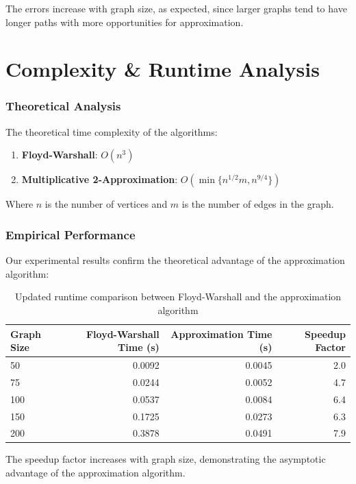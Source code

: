 \documentclass[a4paper,11pt,oneside]{book}
\begin{document}
The errors increase with graph size, as expected, since larger graphs tend to have longer paths with more opportunities for approximation.

\part{Complexity \& Runtime Analysis}

\section*{Theoretical Analysis}

The theoretical time complexity of the algorithms:

\begin{enumerate}
    \item \textbf{Floyd-Warshall}: $O(n^3)$
    \item \textbf{Multiplicative 2-Approximation}: $O(\min\{n^{1/2}m, n^{9/4}\})$
\end{enumerate}

Where $n$ is the number of vertices and $m$ is the number of edges in the graph.

\section*{Empirical Performance}

Our experimental results confirm the theoretical advantage of the approximation algorithm:

\begin{table}[h]
\centering
\begin{tabular}{@{}lrrr@{}}
\toprule
\textbf{Graph Size} & \textbf{Floyd-Warshall Time (s)} & \textbf{Approximation Time (s)} & \textbf{Speedup Factor} \\
\midrule
50  & 0.0092 & 0.0045 & 2.0 \\
75  & 0.0244 & 0.0052 & 4.7 \\
100 & 0.0537 & 0.0084 & 6.4 \\
150 & 0.1725 & 0.0273 & 6.3 \\
200 & 0.3878 & 0.0491 & 7.9 \\
\bottomrule
\end{tabular}
\caption{Updated runtime comparison between Floyd-Warshall and the approximation algorithm}
\end{table}


The speedup factor increases with graph size, demonstrating the asymptotic advantage of the approximation algorithm.
\end{document}

